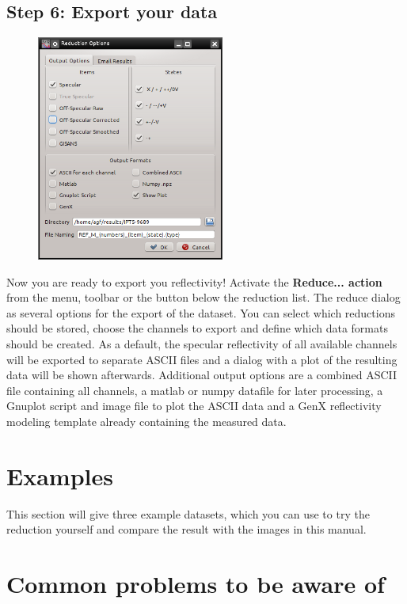   \subsection{Step 6: Export your data}
  \label{sec:export}
    \begin{figure}
    \centering
     \includegraphics[width=175pt]{screenshots/reduced.png}
    \end{figure}
    Now you are ready to export you reflectivity! 
    Activate the \textbf{Reduce... action}  from the menu, toolbar or the button below the reduction list.
    The reduce dialog as several options for the export of the dataset.
    You can select which reductions should be stored, choose the channels to export and define which data formats should be created.
    As a default, the specular reflectivity of all available channels will be exported to separate ASCII files and a dialog with a plot of the resulting data will be shown afterwards.
    Additional output options are a combined ASCII file containing all channels, a matlab or numpy datafile for later processing, a Gnuplot script and image file to plot the ASCII data and a GenX reflectivity modeling template already containing the measured data.
    
    

\section{Examples}
  This section will give three example datasets, which you can use to try the reduction yourself and compare the result with the images in this manual.
  
\section{Common problems to be aware of}
